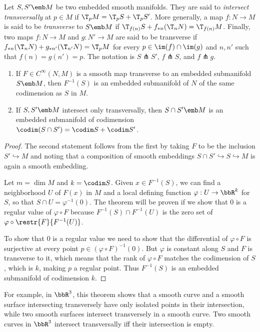 \begin{defn}[Transversality]
Let $S,S'\emb M$ be two embedded smooth manifolds. They are said to \emph{intersect transversally} at $p\in M$ if $\T_p M=\T_p S+ \T_p S'$. More generally, a map $f:N\to M$ is said to be \emph{transverse} to $S\emb M$ if $\T_{f(n)}S+f_{\ast n}(\T_n N)=\T_{f(n)}M$. Finally, two maps $f:N\to M$ and $g:N'\to M$ are said to be transverse if $f_{\ast n}(\T_nN)+g_{\ast n'}(\T_{n'}N)=\T_p M$ for every $p\in\im(f)\cap\im(g)$ and $n,n'$ such that $f(n)=g(n')=p$. The notation is $S\pitchfork S'$, $f\pitchfork S$, and $f\pitchfork g$.
\end{defn}
\begin{thm}\label{thm 6.30 Lee}
\begin{enumerate}
    \item If $F\in C^\infty(N,M)$ is a smooth map transverse to an embedded submanifold $S\emb M$, then $F^{-1}(S)$ is an embedded submanifold of $N$ of the same codimension as $S$ in $M$.
    \item If $S,S'\emb M$ intersect only transversally, then $S\cap S'\emb M$ is an embedded submanifold of codimension  $\codim(S\cap S')=\codim S+\codim S'$.
\end{enumerate}
\end{thm}
\begin{proof}
The second statement follows from the first by taking $F$ to be the inclusion $S'\hookrightarrow M$ and noting that a composition of smooth embeddings $S\cap S'\hookrightarrow S\hookrightarrow M$ is again a smooth embedding.

Let $m=\dim M$ and $k=\codim S$. Given $x\in F^{-1}(S)$, we can find a neighborhood $U$ of $F(x)$ in $M$ and a local defining function $\varphi:U\to \bbR^k$ for $S$, so that $S\cap U=\varphi^{-1}(0)$. The theorem will be proven if we show that $0$ is a regular value of $\varphi\circ F$ because $F^{-1}(S)\cap F^{-1}(U)$ is the zero set of $\varphi\circ \restr{F}{F^{-1}(U)}$.

To show that $0$ is a regular value we need to show that the differential of $\varphi\circ F$ is surjective at every point $p\in (\varphi\circ F)^{-1}(0)$. But $\varphi$ is constant along $S$ and $F$ is transverse to it, which means that the rank of $\varphi\circ F$ matches the codimension of $S$, which is $k$, making $p$ a regular point. Thus $F^{-1}(S)$ is an embedded submanifold of codimension $k$.
\end{proof}

For example, in $\bbR^3$, this theorem shows that a smooth curve and a smooth surface intersecting transversely have only isolated points in their intersection, while two smooth surfaces intersect transversely in a smooth curve. Two smooth curves in $\bbR^3$ intersect transversally iff their intersection is empty.

